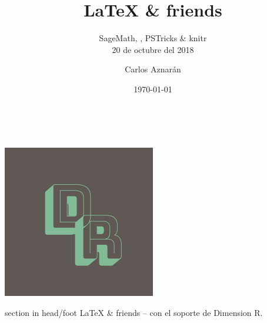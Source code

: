 \documentclass[spanish]{beamer}
\title[\LaTeX{} \& friends]{\LaTeX{} \& friends}
\subtitle{SageMath, \arara, PSTricks \& knitr\\[\baselineskip]
20 de octubre del 2018}
\author[Dimension R]{Carlos Aznarán}
\institute[Universidad Nacional de Ingeniería]{Matemáticas\\
Facultad de Ciencias\\
Universidad Nacional de Ingeniería}
\date[\today]{\today}
\begin{document}
\begin{frame}
\titlepage
\end{frame}

\begin{frame}
\frametitle{\contentsname}
\tableofcontents
\end{frame}







\begin{frame}[plain,b]
\centering
\huge \textcolor{white}{¡Gracias por su atención!}
\normalsize
\begin{center}
	\includegraphics[width=0.5\textwidth]{DimensionR}\\
\end{center}
\vspace*{\fill}

\begin{beamercolorbox}[wd=\paperwidth]{section in head/foot}
\centering\large
\LaTeX{} \& friends -- con el soporte de Dimension R.
\vskip10pt
\end{beamercolorbox}
\end{frame}
\end{document}
